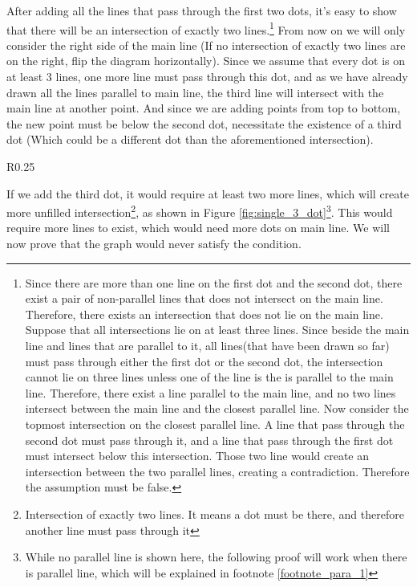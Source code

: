 \documentclass[a4paper, 12pt]{article}
\begin{document}
After adding all the lines that pass through the first two dots, it's easy to show that there will be an intersection of exactly two lines.\footnote{Since there are more than one line on the first dot and the second dot, there exist a pair of non-parallel lines that does not intersect on the main line. Therefore, there exists an intersection that does not lie on the main line. Suppose that all intersections lie on at least three lines. Since beside the main line and lines that are parallel to it, all lines(that have been drawn so far) must pass through either the first dot or the second dot, the intersection cannot lie on three lines unless one of the line is the is parallel to the main line. Therefore, there exist a line parallel to the main line, and no two lines intersect between the main line and the closest parallel line. Now consider the topmost intersection on the closest parallel line. A line that pass through the second dot must pass through it, and a line that pass through the first dot must intersect below this intersection. Those two line would create an intersection between the two parallel lines, creating a contradiction. Therefore the assumption must be false. } From now on we will only consider the right side of the main line (If no intersection of exactly two lines are on the right, flip the diagram horizontally). Since we assume that every dot is on at least 3 lines, one more line must pass through this dot, and as we have already drawn all the lines parallel to main line, the third line will intersect with the main line at another point. And since we are adding points from top to bottom, the new point must be below the second dot, necessitate the existence of a third dot (Which could be a different dot than the aforementioned intersection).

\begin{wrapfigure}{R}{0.25\textwidth}
    \vspace{-2cm}
    
    \caption{Trying to fill the unfilled intersection. Note the new intersection in closer to the main line}
    \label{fig:single_3_dot}
    \vspace{-1\baselineskip}
\end{wrapfigure}
If we add the third dot, it would require at least two more lines, which will create more unfilled intersection\footnote{Intersection of exactly two lines. It means a dot must be there, and therefore another line must pass through it}, as shown in Figure \ref{fig:single_3_dot}\footnote{While no parallel line is shown here, the following proof will work when there is parallel line, which will be explained in footnote \ref{footnote_para_1}}. This would require more lines to exist, which would need more dots on main line. We will now prove that the graph would never satisfy the condition.
\end{document}
